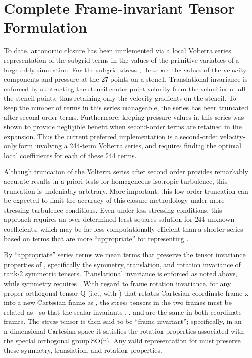 \graphicspath{ {./Ch9/}  } 

\chapter{Complete Frame-invariant Tensor Formulation}

To date, autonomic closure has been implemented via a local Volterra series representation of the subgrid terms in the values of the primitive variables of a large eddy simulation.  For the subgrid stress  , these are the values of the velocity components and pressure at the 27 points on a   stencil. Translational invariance is enforced by subtracting the stencil center-point velocity from the velocities at all the stencil points, thus retaining only the velocity gradients on the stencil. To keep the number of terms in this series manageable, the series has been truncated after second-order terms. Furthermore, keeping pressure values in this series was shown to provide negligible benefit when second-order terms are retained in the expansion. Thus the current preferred implementation is a second-order velocity-only form involving a 244-term Volterra series, and requires finding the optimal local coefficients for each of these 244 terms. 

Although truncation of the Volterra series after second order provides remarkably accurate results in a priori tests for homogeneous isotropic turbulence, this truncation is undeniably arbitrary. More important, this low-order truncation can be expected to limit the accuracy of this closure methodology under more stressing turbulence conditions. Even under less stressing conditions, this approach requires an over-determined least-squares solution for 244 unknown coefficients, which may be far less computationally efficient than a shorter series based on terms that are more “appropriate” for representing  . 

By “appropriate” series terms we mean terms that preserve the tensor invariance properties of  , specifically the symmetry, translation, and rotation invariance of rank-2 symmetric tensors.  Translational invariance is enforced as noted above, while symmetry requires  .  With regard to frame rotation invariance, for any proper orthogonal tensor Q (i.e.,   with  ) that rotates Cartesian coordinate frame x into a new Cartesian frame   as  , the stress tensors in the two frames must be related as  , so that the scalar invariants  ,  , and   are the same in both coordinate frames.  The stress tensor is then said to be “frame invariant”; specifically, in an n-dimensional Cartesian space it satisfies the rotation properties associated with the special orthogonal group SO(n).  Any valid representation for   must preserve these symmetry, translation, and rotation properties.

